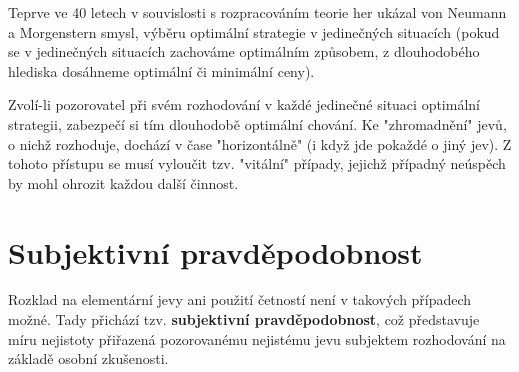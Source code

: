 	Teprve ve 40 letech v souvislosti s rozpracováním teorie her ukázal von Neumann a Morgenstern smysl, výběru optimální strategie v jedinečných situacích (pokud se v jedinečných situacích zachováme optimálním způsobem, z dlouhodobého hlediska dosáhneme optimální či minimální ceny).\br
	
	Zvolí-li pozorovatel při svém rozhodování v každé jedinečné situaci optimální strategii, zabezpečí si tím dlouhodobě optimální chování. Ke "zhromadnění" jevů, o nichž rozhoduje, dochází v čase "horizontálně" (i když jde pokaždé o jiný jev). Z tohoto přístupu se musí vyloučit tzv. "vitální" případy, jejichž případný neúspěch by mohl ohrozit každou další činnost.
	
	\section{Subjektivní pravděpodobnost}
	Rozklad na elementární jevy ani použití četností není v takových případech možné. Tady přichází tzv. \textbf{subjektivní pravděpodobnost}, což představuje míru nejistoty přiřazená pozorovanému nejistému jevu subjektem rozhodování na základě osobní zkušenosti.
	
